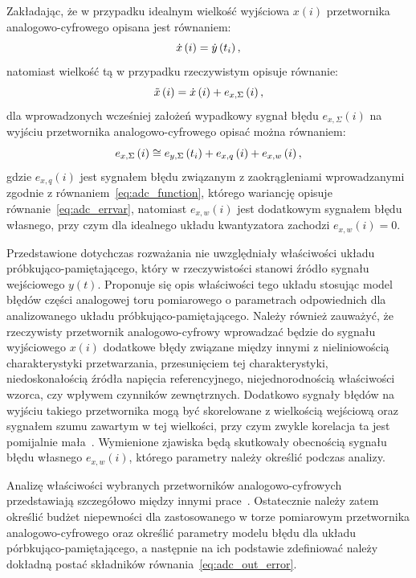 Zakładając, że w przypadku idealnym wielkość wyjściowa $x(i)$ przetwornika analogowo-cyfrowego opisana jest równaniem:
\begin{equation}
\dot{x} \left(i\right) = \dot{y} \left(t_{i}\right) \label{eq:adc_out_ideal},
\end{equation}
natomiast wielkość tą w przypadku rzeczywistym opisuje równanie:
\begin{equation}
\tilde{x} \left(i\right) = \dot{x} \left(i\right) + e_{x,\Sigma} \left(i\right) \label{eq:adc_out_real},
\end{equation}
dla wprowadzonych wcześniej założeń wypadkowy sygnał błędu $e_{x,\Sigma}(i)$ na wyjściu przetwornika analogowo-cyfrowego opisać można równaniem:
\begin{equation}
e_{x,\Sigma} \left(i\right) \cong e_{y,\Sigma} \left(t_{i}\right) + e_{x,q} \left(i\right) + e_{x,w} \left(i\right) \label{eq:adc_out_error},
\end{equation}
gdzie $e_{x,q}(i)$ jest sygnałem błędu związanym z zaokrągleniami wprowadzanymi zgodnie z równaniem~\eqref{eq:adc_function}, którego wariancję opisuje równanie~\eqref{eq:adc_errvar}, natomiast $e_{x,w}(i)$ jest dodatkowym sygnałem błędu własnego, przy czym dla idealnego układu kwantyzatora zachodzi $e_{x,w}(i) = 0$.

Przedstawione dotychczas rozważania nie uwzględniały właściwości układu próbkująco-pamiętającego, który w rzeczywistości stanowi źródło sygnału wejściowego $y(t)$. Proponuje się opis właściwości tego układu stosując model błędów części analogowej toru pomiarowego o parametrach odpowiednich dla analizowanego układu próbkująco-pamiętającego. Należy również zauważyć, że rzeczywisty przetwornik analogowo-cyfrowy wprowadzać będzie do sygnału wyjściowego $x(i)$ dodatkowe błędy związane między innymi z nieliniowością charakterystyki przetwarzania, przesunięciem tej charakterystyki, niedoskonałością źródła napięcia referencyjnego, niejednorodnością właściwości wzorca, czy wpływem czynników zewnętrznych. Dodatkowo sygnały błędów na wyjściu takiego przetwornika mogą być skorelowane z wielkością wejściową oraz sygnałem szumu zawartym w tej wielkości, przy czym zwykle korelacja ta jest pomijalnie mała~\cite{sienkowski_adc}. Wymienione zjawiska będą skutkowały obecnością sygnału błędu własnego $e_{x,w}(i)$, którego parametry należy określić podczas analizy.

Analizę właściwości wybranych przetworników analogowo-cyfrowych przedstawiają szczegółowo między innymi prace~\cite{jakubiec_przetwarzanie, jakubiec_system, sienkowski_adc, sienkowski_kwant, arpaia_deltasigma}. Ostatecznie należy zatem określić budżet niepewności dla zastosowanego w torze pomiarowym przetwornika analogowo-cyfrowego oraz określić parametry modelu błędu dla układu pórbkująco-pamiętającego, a następnie na ich podstawie zdefiniować należy dokładną postać składników równania~\eqref{eq:adc_out_error}.

